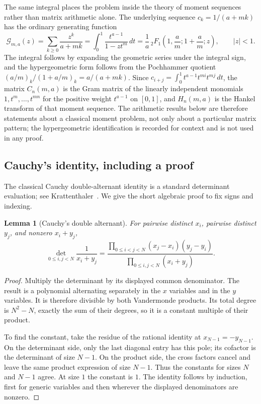 \documentclass[11pt,a4paper]{article}
\numberwithin{equation}{section}
\newtheorem{lemma}[theorem]{Lemma}
\theoremstyle{definition}
\theoremstyle{remark}
\begin{document}
The same integral places the problem inside the theory of moment sequences rather than matrix arithmetic alone. The underlying sequence $c_k=1/(a+mk)$ has the ordinary generating function
\begin{equation}\label{eq:momentgf}
 \mathcal G_{m,a}(z)=\sum_{k\geq0}\frac{z^k}{a+mk}
 =\int_0^1\frac{t^{a-1}}{1-zt^m}\,dt
 =\frac1a\,{}_2F_1\!\left(1,\frac am;1+\frac am;z\right),
 \qquad|z|<1.
\end{equation}
The integral follows by expanding the geometric series under the integral sign, and the hypergeometric form follows from the Pochhammer quotient
$(a/m)_k/(1+a/m)_k=a/(a+mk)$. Since $c_{i+j}=\int_0^1t^{a-1}t^{mi}t^{mj}\,dt$, the matrix $C_n(m,a)$ is the Gram matrix of the linearly independent monomials $1,t^m,\ldots,t^{mn}$ for the positive weight $t^{a-1}$ on $[0,1]$, and $H_n(m,a)$ is the Hankel transform of that moment sequence. The arithmetic results below are therefore statements about a classical moment problem, not only about a particular matrix pattern; the hypergeometric identification is recorded for context and is not used in any proof.

\subsection{Cauchy's identity, including a proof}
The classical Cauchy double-alternant identity is a standard determinant evaluation; see Krattenthaler~\cite[Eq.~(2.7)]{krattenthaler}. We give the short algebraic proof to fix signs and indexing.

\begin{lemma}[Cauchy's double alternant]\label{lem:cauchy}
For pairwise distinct $x_i$, pairwise distinct $y_j$, and nonzero $x_i+y_j$,
\begin{equation}\label{eq:cauchy}
 \det_{0\leq i,j<N}\frac1{x_i+y_j}
 =\frac{\displaystyle\prod_{0\leq i<j<N}(x_j-x_i)(y_j-y_i)}
 {\displaystyle\prod_{0\leq i,j<N}(x_i+y_j)}.
\end{equation}
\end{lemma}
\begin{proof}
Multiply the determinant by its displayed common denominator. The result is a polynomial alternating separately in the $x$ variables and in the $y$ variables. It is therefore divisible by both Vandermonde products. Its total degree is $N^2-N$, exactly the sum of their degrees, so it is a constant multiple of their product.

To find the constant, take the residue of the rational identity at $x_{N-1}=-y_{N-1}$. On the determinant side, only the last diagonal entry has this pole; its cofactor is the determinant of size $N-1$. On the product side, the cross factors cancel and leave the same product expression of size $N-1$. Thus the constants for sizes $N$ and $N-1$ agree. At size $1$ the constant is $1$. The identity follows by induction, first for generic variables and then wherever the displayed denominators are nonzero.
\end{proof}
\end{document}
